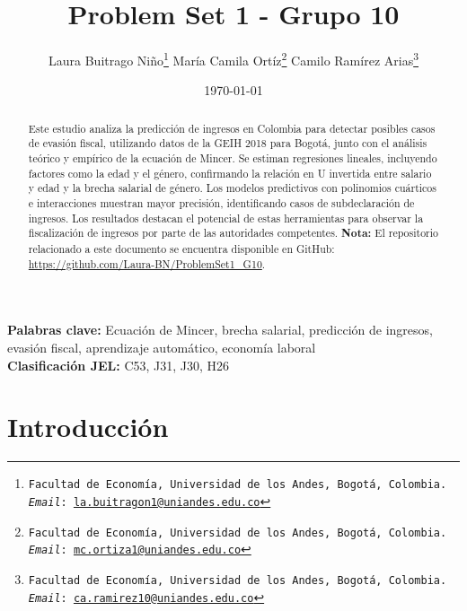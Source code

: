 \documentclass[12pt,a4paper,onecolumn]{article}
\title{Problem Set 1 - Grupo 10}
\author{
  Laura Buitrago Niño\thanks{\texttt{Facultad de Economía, Universidad de los Andes, Bogotá, Colombia. \textit{Email}: \href{mailto:la.buitragon1@uniandes.edu.co}{la.buitragon1@uniandes.edu.co}}}
  \quad
  María Camila Ortíz\thanks{\texttt{Facultad de Economía, Universidad de los Andes, Bogotá, Colombia. \textit{Email}: \href{mailto:mc.ortiza1@uniandes.edu.co}{mc.ortiza1@uniandes.edu.co}}}
  \quad
  Camilo Ramírez Arias\thanks{\texttt{Facultad de Economía, Universidad de los Andes, Bogotá, Colombia. \textit{Email}: \href{mailto:ca.ramirez10@uniandes.edu.co}{ca.ramirez10@uniandes.edu.co}}}
}
\date{\today}
\begin{document}
\maketitle
\thispagestyle{empty} %


\begin{abstract}
Este estudio analiza la predicción de ingresos en Colombia para detectar posibles casos de evasión fiscal, utilizando datos de la GEIH 2018 para Bogotá, junto con el análisis teórico y empírico de la ecuación de Mincer. Se estiman regresiones lineales, incluyendo factores como la edad y el género, confirmando la relación en U invertida entre salario y edad y la brecha salarial de género. Los modelos predictivos con polinomios cuárticos e interacciones muestran mayor precisión, identificando casos de subdeclaración de ingresos. Los resultados destacan el potencial de estas herramientas para observar la fiscalización de ingresos por parte de las autoridades competentes.
\bigbreak
\textbf{Nota:} El repositorio relacionado a este documento se encuentra disponible en GitHub: \url{https://github.com/Laura-BN/ProblemSet1_G10}.
\end{abstract}

\medskip

\begin{flushleft}
	{\bf Palabras clave:} Ecuación de Mincer, brecha salarial, predicción de ingresos, evasión fiscal, aprendizaje automático, economía laboral 				\\
	{\bf Clasificación JEL:} C53, J31, J30, H26
\end{flushleft}


\newpage
\section{Introducción} \label{sec:intro}
\end{document}
